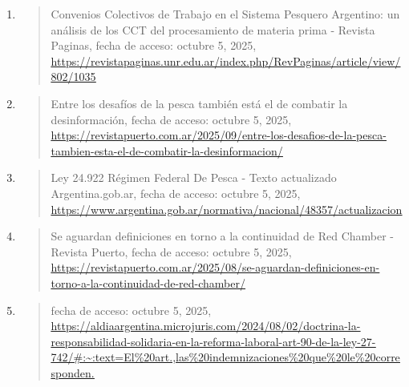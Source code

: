 \documentclass[]{article}
\begin{document}
\begin{enumerate}
\begin{quote}
  \end{quote}
\item
  \begin{quote}
  Convenios Colectivos de Trabajo en el Sistema Pesquero Argentino: un
  análisis de los CCT del procesamiento de materia prima - Revista
  Paginas, fecha de acceso: octubre 5, 2025,
  \href{https://revistapaginas.unr.edu.ar/index.php/RevPaginas/article/view/802/1035}{\uline{https://revistapaginas.unr.edu.ar/index.php/RevPaginas/article/view/802/1035}}
  \end{quote}
\item
  \begin{quote}
  Entre los desafíos de la pesca también está el de combatir la
  desinformación, fecha de acceso: octubre 5, 2025,
  \href{https://revistapuerto.com.ar/2025/09/entre-los-desafios-de-la-pesca-tambien-esta-el-de-combatir-la-desinformacion/}{\uline{https://revistapuerto.com.ar/2025/09/entre-los-desafios-de-la-pesca-tambien-esta-el-de-combatir-la-desinformacion/}}
  \end{quote}
\item
  \begin{quote}
  Ley 24.922 Régimen Federal De Pesca - Texto actualizado \textbar{}
  Argentina.gob.ar, fecha de acceso: octubre 5, 2025,
  \href{https://www.argentina.gob.ar/normativa/nacional/48357/actualizacion}{\uline{https://www.argentina.gob.ar/normativa/nacional/48357/actualizacion}}
  \end{quote}
\item
  \begin{quote}
  Se aguardan definiciones en torno a la continuidad de Red Chamber -
  Revista Puerto, fecha de acceso: octubre 5, 2025,
  \href{https://revistapuerto.com.ar/2025/08/se-aguardan-definiciones-en-torno-a-la-continuidad-de-red-chamber/}{\uline{https://revistapuerto.com.ar/2025/08/se-aguardan-definiciones-en-torno-a-la-continuidad-de-red-chamber/}}
  \end{quote}
\item
  \begin{quote}
  fecha de acceso: octubre 5, 2025,
  \href{https://aldiaargentina.microjuris.com/2024/08/02/doctrina-la-responsabilidad-solidaria-en-la-reforma-laboral-art-90-de-la-ley-27-742/\#:~:text=El\%20art.,las\%20indemnizaciones\%20que\%20le\%20corresponden.}{\uline{https://aldiaargentina.microjuris.com/2024/08/02/doctrina-la-responsabilidad-solidaria-en-la-reforma-laboral-art-90-de-la-ley-27-742/\#:\textasciitilde:text=El\%20art.,las\%20indemnizaciones\%20que\%20le\%20corresponden.}}

\end{quote}
\end{enumerate}
\end{document}
